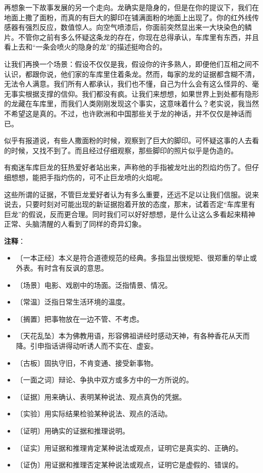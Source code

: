\documentclass[12pt,UTF-8,openany]{ctexbook}
\begin{document}
\begin{large}
    再想象一下故事发展的另一个走向。龙确实是隐身的，但是在你的提议下，我们在地面上撒了面粉，而真的有巨大的脚印在铺满面粉的地面上出现了。你的红外线传感器有强烈反应，数值惊人。向空气喷漆后，你面前突然显出来一大块染色的鳞片。不管你之前有多么怀疑这条龙的存在，你现在总得承认，车库里有东西，并且看上去和“一条会喷火的隐身的龙”的描述挺吻合的。
    
    让我们再换一个场景：假设不仅仅是我，假设你的许多熟人，即便他们互相之间不认识，都跟你说，他们家的车库里住着条龙。然而，每家的龙的证据都含糊不清，无法令人满意。我们所有人都承认，我们也不懂，自己为什么会有这么怪异的、毫无事实根据支撑的信仰。我们都没有疯。让我们来想想，如果世界上到处都有隐形的龙藏在车库里，而我们人类刚刚发现这个事实，这意味着什么？老实说，我当然不希望这是真的。不过，也许欧洲和中国那些关于龙的神话，并不仅仅是神话而已。
    
    似乎有报道说，有些人撒面粉的时候，观察到了巨大的脚印。可怀疑这事的人去看的时候，又找不到了。而且经过仔细观察，那些脚印的照片似乎是伪造的。
    
    有痴迷车库巨龙的狂热爱好者站出来，声称他的手指被龙吐出的烈焰灼伤了。但仔细想想，能把手指灼伤的，可不止巨龙喷的火焰呢。
    
    这些所谓的证据，不管巨龙爱好者认为有多么重要，还远不足以让我们信服。说来说去，只要时刻对可能出现的新证据抱着开放的态度，那末，试着否定“车库里有巨龙”的假说，反而更合理。同时我们可以好好想想，是什么让这么多看起来精神正常、头脑清醒的人看到了同样的奇异幻象。
    
\end{large}


\newpage

\textbf{注释}：

\vspace{-1em}

\begin{itemize}
    \setlength\itemsep{-0.2em}
    \item 〔一本正经〕本义是符合道德规范的经典。多指显出很规矩、很郑重的举止或外表。有时含有反讽的意思。
    \item 〔场景〕电影、戏剧中的场面。泛指情景、情况。
    \item 〔常温〕泛指日常生活环境的温度。
    \item 〔搁置〕把事物放在一边不管、不考虑。
    \item 〔天花乱坠〕本为佛教用语，形容佛祖讲经时感动天神，有各种香花从天而降。引申指话讲得动听诱人而不实在、虚妄。
    \item 〔古板〕固执守旧，不肯变通、接受新事物。
    \item 〔一面之词〕辩论、争执中双方或多方中的一方所说的。
    \item 〔证据〕用来确认、表明某种说法、观点真伪的凭据。
    \item 〔实验〕用实际结果检验某种说法、观点的活动。
    \item 〔证明〕用确实的证据和推理说明。
    \item 〔证实〕用证据和推理肯定某种说法或观点，证明它是真实的、正确的。
    \item 〔证伪〕用证据和推理否定某种说法或观点，证明它是虚假的、错误的。
\end{itemize}
\end{document}
